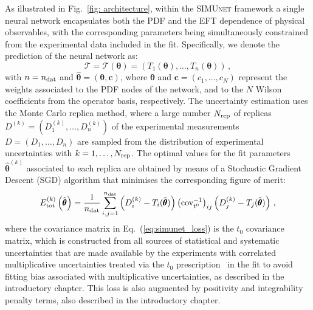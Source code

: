 \documentclass[withindex,glossary]{cam-thesis}
\newcommand{\simunet}{\textsc{SIMUnet}}
\begin{document}

As illustrated in Fig.~\ref{fig: architecture}, within
the \simunet{} framework a single neural network
encapsulates both the PDF and the EFT dependence of physical observables,
with the corresponding parameters being simultaneously constrained from the experimental
data included in the fit.
%
Specifically, we denote the prediction of the neural network as:
\begin{equation}
\mathcal{T} = \mathcal{T}(\pmb{\theta})= \left( T_1(\pmb{\theta}),\ldots, T_n(\pmb{\theta})\right) \, ,
\end{equation}
with $n=n_{\rm dat}$ and 
$\hat{\pmb{\theta}} = (\pmb{\theta}, \boldsymbol{c})$, where $\pmb{\theta}$ and $\boldsymbol{c}=(c_1, \ldots, c_N)$ represent
the weights associated to the PDF nodes
of the network, and to the $N$ Wilson coefficients from
the operator basis, respectively.
%
The uncertainty estimation uses the Monte Carlo replica method, where a large number $N_{\rm rep}$
of replicas $D^{(k)}=\left( D_1^{(k)}, \ldots, D_n^{(k)}\right)$
of the experimental measurements $D=\left( D_1, \ldots, D_n\right)$ are sampled from the
distribution of experimental uncertainties with $k=1,\ldots,N_{\rm rep}$.
%
The optimal values for the fit parameters $\hat{\pmb{\theta}}^{(k)}$ associated
to each replica are obtained by means of a Stochastic Gradient Descent (SGD) algorithm
that minimises the corresponding figure of merit:
%
\begin{equation}
  \label{eq:simunet_loss}
  E_{\rm tot}^{(k)}\left( \hat{\pmb{\theta}}\right)  = \frac{1}{n_{\rm dat}}\sum_{i,j=1}^{n_{\rm dat}} \left( D_i^{(k)} - T_i(\hat{\pmb{\theta}}) \right) \left( {\rm cov}_{t^0}^{-1} \right)_{ij}
  \left( D_j^{(k)} - T_j(\hat{\pmb{\theta}}) \right) \, ,
\end{equation}
where the covariance matrix in Eq.~(\ref{eq:simunet_loss})
is the $t_0$ covariance matrix, which is constructed from all sources of statistical and
systematic uncertainties that are made available by the experiments
with correlated multiplicative uncertainties treated via the $t_0$ prescription~\cite{Ball:2009qv} 
in the fit to avoid fitting bias associated with multiplicative uncertainties, as described in the introductory
chapter. This loss is also augmented by positivity and integrability penalty terms, also
described in the introductory chapter.
\end{document}
